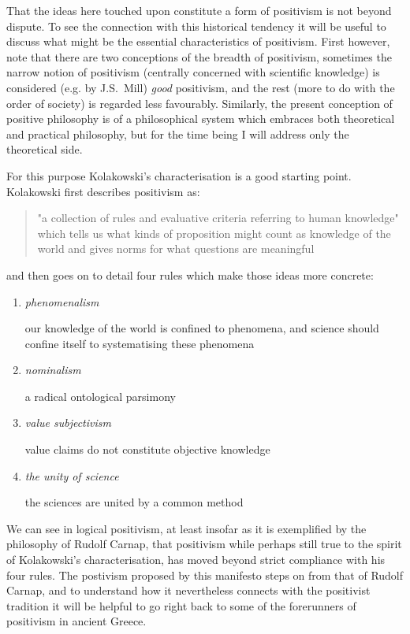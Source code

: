 That the ideas here touched upon constitute a form of positivism is not beyond dispute.
To see the connection with this historical tendency it will be useful to discuss what might be the essential characteristics of positivism.
First however, note that there are two conceptions of the breadth of positivism, sometimes the narrow notion of positivism (centrally concerned with scientific knowledge) is considered (e.g. by J.S.~Mill) \emph{good} positivism, and the rest (more to do with the order of society) is regarded less favourably.
Similarly, the present conception of positive philosophy is of a philosophical system which embraces both theoretical and practical philosophy, but for the time being I will address only the theoretical side.

For this purpose Kolakowski's characterisation is a good starting point.
Kolakowski first describes positivism as:
\begin{quotation}
"a collection of rules and evaluative criteria referring to human knowledge" which tells us what kinds of proposition might count as knowledge of the world and gives norms for what questions are meaningful
\end{quotation}
and then goes on to detail four rules which make those ideas more concrete:

\begin{enumerate}
\item \emph{phenomenalism}

our knowledge of the world is confined to phenomena, and science should confine itself to systematising these phenomena
\item \emph{nominalism}

a radical ontological parsimony
\item \emph{value subjectivism}

value claims do not constitute objective knowledge
\item \emph{the unity of science}

the sciences are united by a common method
\end{enumerate}

We can see in logical positivism, at least insofar as it is exemplified by the philosophy of Rudolf Carnap, that positivism while perhaps still true to the spirit of Kolakowski's characterisation, has moved beyond strict compliance with his four rules.
The postivism proposed by this manifesto steps on from that of Rudolf Carnap, and to understand how it nevertheless connects with the positivist tradition it will be helpful to go right back to some of the forerunners of positivism in ancient Greece.

